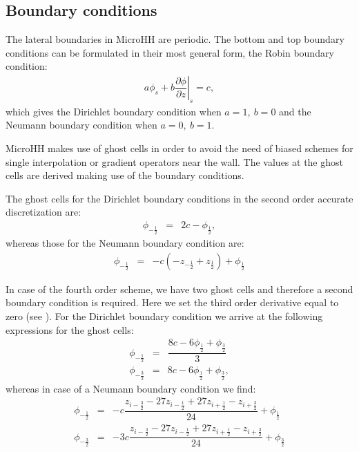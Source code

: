 \documentclass[gmd]{copernicus}
\begin{document}
\subsection{Boundary conditions}
The lateral boundaries in MicroHH are periodic. The bottom and top boundary conditions can be formulated in their most general form, the Robin boundary condition:
\begin{eqnarray}
a \phi_s + b \left.\dfrac{\partial \phi}{\partial z}\right|_s = c,
\end{eqnarray}
which gives the Dirichlet boundary condition when ${a=1,~b=0}$ and the Neumann boundary condition when ${a=0,~b=1}$. 

MicroHH makes use of ghost cells in order to avoid the need of biased schemes for single interpolation or gradient operators near the wall. The values at the ghost cells are derived making use of the boundary conditions. 

The ghost cells for the Dirichlet boundary conditions in the second order accurate discretization are:
\begin{eqnarray}
\phi_{-\frac{1}{2}} & = & 2 c - \phi_{\frac{1}{2}},
\end{eqnarray}
whereas those for the Neumann boundary condition are:
\begin{eqnarray}
\phi_{-\frac{1}{2}} & = & -c \left( - z_{-\frac{1}{2}} + z_{\frac{1}{2}} \right) + \phi_{\frac{1}{2}}
\end{eqnarray}

In case of the fourth order scheme, we have two ghost cells and therefore a second boundary condition is required. Here we set the third order derivative equal to zero (see \citet{Morinishi1998}). For the Dirichlet boundary condition we arrive at the following expressions for the ghost cells:
\begin{eqnarray}
\phi_{-\frac{1}{2}} & = & \dfrac{8 c - 6 \phi_{\frac{1}{2}} + \phi_{\frac{3}{2}}}{3} \\
\phi_{-\frac{3}{2}} & = & 8 c - 6 \phi_{\frac{1}{2}} + \phi_{\frac{3}{2}},
\end{eqnarray}
whereas in case of a Neumann boundary condition we find:
\begin{eqnarray}
\phi_{-\frac{1}{2}} & = & -c  \dfrac{z_{i-\frac{3}{2}} - 27 z_{i-\frac{1}{2}} + 27 z_{i+\frac{1}{2}} - z_{i+\frac{3}{2}}}{24} + \phi_{\frac{1}{2}} \\
\phi_{-\frac{3}{2}} & = & -3c \dfrac{z_{i-\frac{3}{2}} - 27 z_{i-\frac{1}{2}} + 27 z_{i+\frac{1}{2}} - z_{i+\frac{3}{2}}}{24} + \phi_{\frac{3}{2}}
\end{eqnarray}
\end{document}
